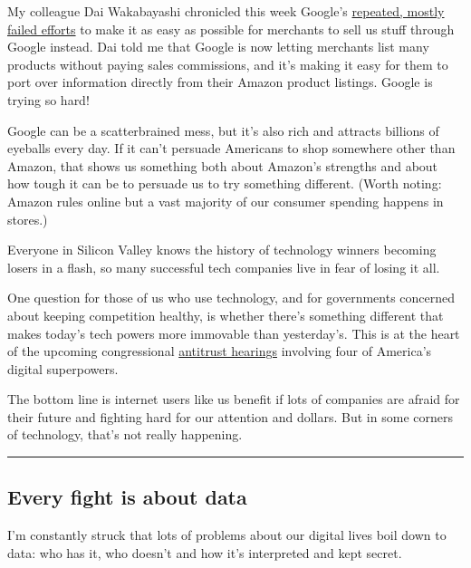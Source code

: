My colleague Dai Wakabayashi chronicled this week Google's
\href{https://www.nytimes3xbfgragh.onion/2020/07/23/technology/google-ecommerce-amazon.html}{repeated,
mostly failed efforts} to make it as easy as possible for merchants to
sell us stuff through Google instead. Dai told me that Google is now
letting merchants list many products without paying sales commissions,
and it's making it easy for them to port over information directly from
their Amazon product listings. Google is trying so hard!

Google can be a scatterbrained mess, but it's also rich and attracts
billions of eyeballs every day. If it can't persuade Americans to shop
somewhere other than Amazon, that shows us something both about Amazon's
strengths and about how tough it can be to persuade us to try something
different. (Worth noting: Amazon rules online but a vast majority of our
consumer spending happens in stores.)

Everyone in Silicon Valley knows the history of technology winners
becoming losers in a flash, so many successful tech companies live in
fear of losing it all.

One question for those of us who use technology, and for governments
concerned about keeping competition healthy, is whether there's
something different that makes today's tech powers more immovable than
yesterday's. This is at the heart of the upcoming congressional
\href{https://www.nytimes3xbfgragh.onion/2020/07/01/technology/amazon-apple-alphabet-facebook-congress-antitrust.html}{antitrust
hearings} involving four of America's digital superpowers.

The bottom line is internet users like us benefit if lots of companies
are afraid for their future and fighting hard for our attention and
dollars. But in some corners of technology, that's not really happening.

\begin{center}\rule{0.5\linewidth}{\linethickness}\end{center}

\hypertarget{every-fight-is-about-data}{%
\subsection{Every fight is about data}\label{every-fight-is-about-data}}

I'm constantly struck that lots of problems about our digital lives boil
down to data: who has it, who doesn't and how it's interpreted and kept
secret.

